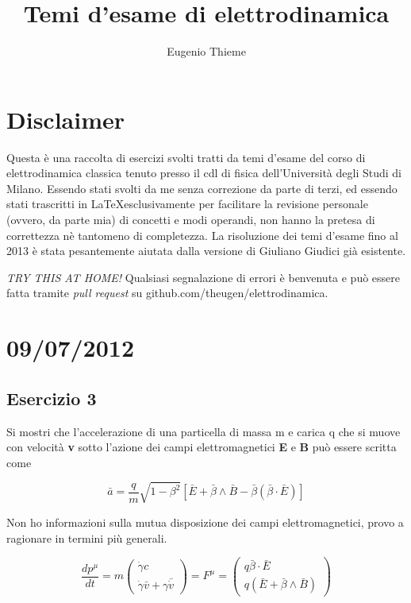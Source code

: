 \documentclass[a4paper,11pt]{book}
\begin{document}
\author{Eugenio Thieme}
\title{Temi d'esame di elettrodinamica}
\maketitle
\tableofcontents

\chapter*{Disclaimer}
Questa è una raccolta di esercizi svolti tratti da temi d'esame del corso
di elettrodinamica classica tenuto presso il cdl di fisica dell'Università
degli Studi di Milano.
Essendo stati svolti da me senza correzione da parte di terzi, ed essendo
stati trascritti in \LaTeX esclusivamente per facilitare la revisione personale (ovvero, da parte mia) di
concetti e modi operandi, non hanno la pretesa di correttezza nè tantomeno
di completezza. 
La risoluzione dei temi d'esame fino al 2013 è stata pesantemente aiutata dalla
versione di Giuliano Giudici già esistente.

\emph{TRY THIS AT HOME!}
Qualsiasi segnalazione di errori è benvenuta e può essere fatta tramite 
\emph{pull request} su github.com/theugen/elettrodinamica.

\chapter*{09/07/2012}
\section*{Esercizio 3}
Si mostri che l'accelerazione di una particella di massa m e carica q che si muove con velocità
\textbf v sotto l'azione dei campi elettromagnetici \textbf E e \textbf B può essere scritta come

\begin{equation}
\bar a = \frac{q}{m} \sqrt{1 - \beta^2} [\bar E + \bar{\beta} \wedge \bar B - \bar \beta (\bar \beta \cdot \bar E)]
\end{equation}

Non ho informazioni sulla mutua disposizione dei campi elettromagnetici, provo
a ragionare in termini più generali.

\begin{equation}
\frac{dp^\mu}{dt} = m 
\left( \begin{array}{c}
\dot \gamma c \\
\dot \gamma \bar v + \gamma \bar{\dot v}
\end{array} \right)
 = F^\mu =
\left( \begin{array}{c}
q \bar \beta \cdot \bar E \\
q(\bar E + \bar \beta \wedge \bar B)
\end{array} \right)
\end{equation}
\end{document}
